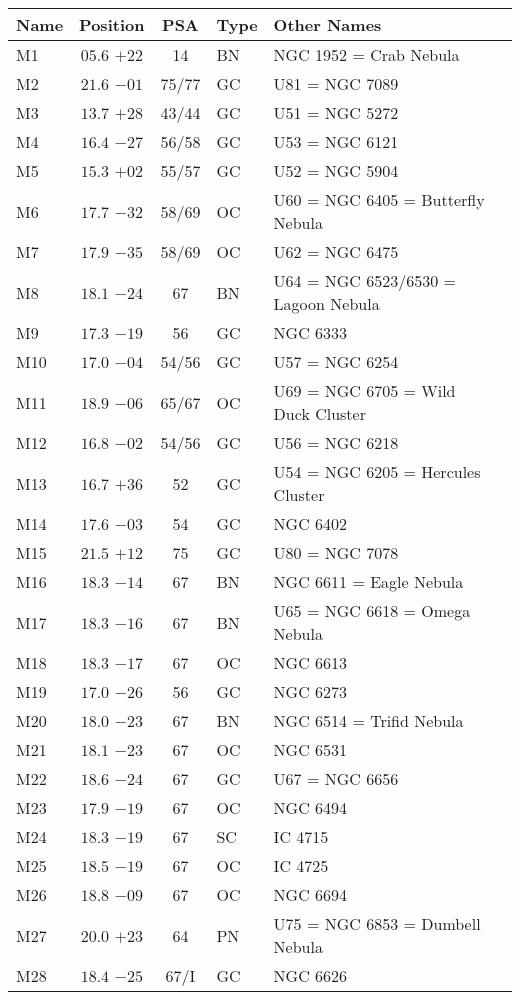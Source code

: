 \begin{table}[t]
\setlength{\tabcolsep}{3pt}
\small
\begin{tabular}{lcclll}
\hline
Name&Position&PSA&Type&Other Names\\
\hline
M1   &$05.6$ $+22$&14&BN &NGC 1952 = Crab Nebula\\
M2   &$21.6$ $-01$&75/77&GC &U81 = NGC 7089\\
M3   &$13.7$ $+28$&43/44&GC &U51 = NGC 5272\\
M4   &$16.4$ $-27$&56/58&GC &U53 = NGC 6121\\
M5   &$15.3$ $+02$&55/57&GC &U52 = NGC 5904\\
M6   &$17.7$ $-32$&58/69&OC &U60 = NGC 6405 = Butterfly Nebula\\
M7   &$17.9$ $-35$&58/69&OC &U62 = NGC 6475\\
M8   &$18.1$ $-24$&67&BN &U64 = NGC 6523/6530 = Lagoon Nebula\\
M9   &$17.3$ $-19$&56&GC &NGC 6333\\
M10  &$17.0$ $-04$&54/56&GC &U57 = NGC 6254\\
M11  &$18.9$ $-06$&65/67&OC &U69 = NGC 6705 = Wild Duck Cluster\\
M12  &$16.8$ $-02$&54/56&GC &U56 = NGC 6218\\
M13  &$16.7$ $+36$&52&GC &U54 = NGC 6205 = Hercules Cluster\\
M14  &$17.6$ $-03$&54&GC &NGC 6402\\
M15  &$21.5$ $+12$&75&GC &U80 = NGC 7078\\
M16  &$18.3$ $-14$&67&BN &NGC 6611 = Eagle Nebula\\
M17  &$18.3$ $-16$&67&BN &U65 = NGC 6618 = Omega Nebula\\
M18  &$18.3$ $-17$&67&OC &NGC 6613\\
M19  &$17.0$ $-26$&56&GC &NGC 6273\\
M20  &$18.0$ $-23$&67&BN &NGC 6514 = Trifid Nebula\\
M21  &$18.1$ $-23$&67&OC &NGC 6531\\
M22  &$18.6$ $-24$&67&GC &U67 = NGC 6656\\
M23  &$17.9$ $-19$&67&OC &NGC 6494\\
M24  &$18.3$ $-19$&67&SC &IC 4715\\
M25  &$18.5$ $-19$&67&OC &IC 4725\\
M26  &$18.8$ $-09$&67&OC &NGC 6694\\
M27  &$20.0$ $+23$&64&PN &U75 = NGC 6853 = Dumbell Nebula\\
M28  &$18.4$ $-25$&67/I&GC &NGC 6626\\

\end{tabular}
\end{table}
